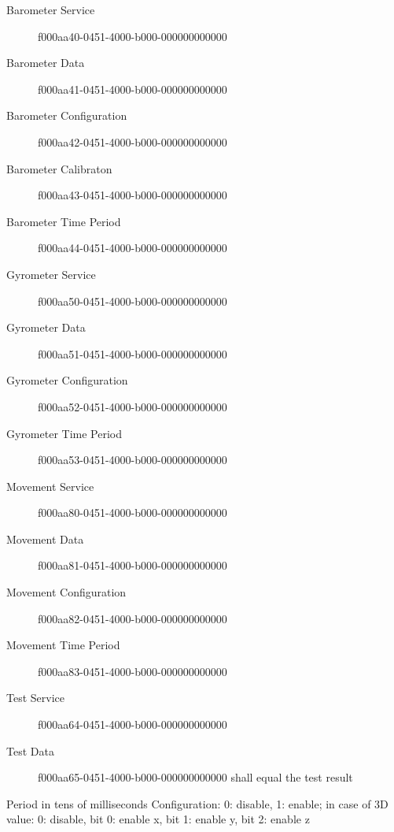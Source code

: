 \begin{description}
\begin{description}
     \item[Barometer Service] f000aa40-0451-4000-b000-000000000000
     \item[Barometer Data] f000aa41-0451-4000-b000-000000000000
     \item[Barometer Configuration] f000aa42-0451-4000-b000-000000000000
     \item[Barometer Calibraton] f000aa43-0451-4000-b000-000000000000
     \item[Barometer Time Period] f000aa44-0451-4000-b000-000000000000

     \item[Gyrometer Service] f000aa50-0451-4000-b000-000000000000
     \item[Gyrometer Data] f000aa51-0451-4000-b000-000000000000
     \item[Gyrometer Configuration] f000aa52-0451-4000-b000-000000000000
     \item[Gyrometer Time Period] f000aa53-0451-4000-b000-000000000000

     \item[Movement Service] f000aa80-0451-4000-b000-000000000000
     \item[Movement Data] f000aa81-0451-4000-b000-000000000000
     \item[Movement Configuration] f000aa82-0451-4000-b000-000000000000
     \item[Movement Time Period] f000aa83-0451-4000-b000-000000000000

     \item[Test Service] f000aa64-0451-4000-b000-000000000000
     \item[Test Data] f000aa65-0451-4000-b000-000000000000 shall equal the test result
   \end{description}
   Period in tens of milliseconds
   Configuration: 0: disable, 1: enable; in case of 3D value: 0: disable, bit 0: enable x, bit 1: enable y, bit 2: enable z
\end{description}
